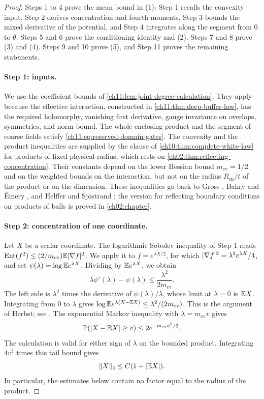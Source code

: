 \begin{proof}
Steps 1 to 4 prove the mean bound in (1): Step 1 recalls the convexity input, Step 2 derives concentration and fourth moments, Step 3 bounds the mixed derivative of the potential, and Step 4 integrates along the segment from $0$ to $\theta$. Steps 5 and 6 prove the conditioning identity and (2). Steps 7 and 8 prove (3) and (4). Steps 9 and 10 prove (5), and Step 11 proves the remaining statements.

\paragraph{Step 1: inputs.}
We use the coefficient bounds of \cref{ch11:lem:joint-degree-calculation}. They apply because the effective interaction, constructed in \cref{ch11:thm:deep-buffer-law}, has the required holomorphy, vanishing first derivative, gauge invariance on overlaps, symmetries, and norm bound. The whole enclosing product and the segment of coarse fields satisfy \eqref{ch11:eq:reserved-domain-gates}. The convexity and the product inequalities are supplied by the clause of \cref{ch10:thm:complete-white-law} for products of fixed physical radius, which rests on \cref{ch02:thm:reflecting-concentration}. Their constants depend on the lower Hessian bound $m_{\mathrm{cv}}=1/2$ and on the weighted bounds on the interaction, but not on the radius $R_{\mathrm{en}}/t$ of the product or on the dimension. These inequalities go back to Gross \cite{Gross1975}, Bakry and \'Emery \cite{BakryEmery1985}, and Helffer and Sj\"ostrand \cite{HelfferSjostrand1994}; the version for reflecting boundary conditions on products of balls is proved in \cref{ch02:chapter}.

\paragraph{Step 2: concentration of one coordinate.}
Let $X$ be a scalar coordinate. The logarithmic Sobolev inequality of Step 1 reads $\operatorname{Ent}(f^2)\le(2/m_{\mathrm{cv}})\mathbb E\lvert \nabla f\rvert^2$. We apply it to $f=e^{\lambda X/2}$, for which $\lvert \nabla f\rvert^2=\lambda^2e^{\lambda X}/4$, and set $\psi(\lambda)=\log\mathbb E e^{\lambda X}$. Dividing by $\mathbb E e^{\lambda X}$, we obtain
\[
 \lambda\psi'(\lambda)-\psi(\lambda)\le\frac{\lambda^2}{2m_{\mathrm{cv}}}.
\]
The left side is $\lambda^2$ times the derivative of $\psi(\lambda)/\lambda$, whose limit at $\lambda=0$ is $\mathbb E X$. Integrating from $0$ to $\lambda$ gives $\log\mathbb E e^{\lambda(X-\mathbb E X)}\le\lambda^2/(2m_{\mathrm{cv}})$. This is the argument of Herbst; see \cite[Section~2.3]{Ledoux1999}. The exponential Markov inequality with $\lambda=m_{\mathrm{cv}}v$ gives
\begin{equation}\label{ch11:eq:scalar-concentration}
 \mathbb P(\lvert X-\mathbb E X\rvert\ge v)\le2e^{-m_{\mathrm{cv}}v^2/2}.
\end{equation}
The calculation is valid for either sign of $\lambda$ on the bounded product. Integrating $4v^3$ times this tail bound gives
\begin{equation}\label{ch11:eq:fourth-moment}
 \lVert X\rVert_4\le C(1+\lvert \mathbb E X\rvert).
\end{equation}
In particular, the estimates below contain no factor equal to the radius of the product.


\end{proof}
